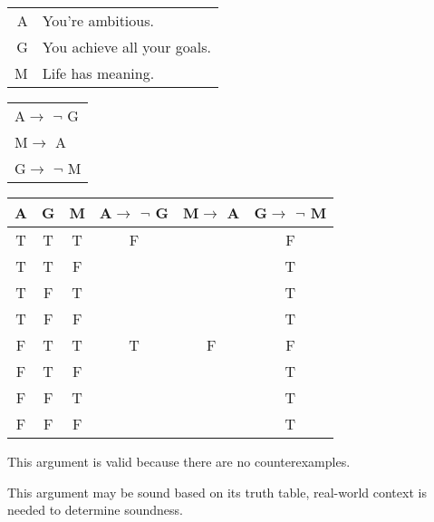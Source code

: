 \section{}
\centering
\begin{tabular}{r l}
    A & You're ambitious. \\
    G & You achieve all your goals. \\
    M & Life has meaning.
\end{tabular}
\begin{tabular}{l}
    A$\rightarrow$ $\lnot$ G\\
    M$\rightarrow$ A\\
    \hline
    G$\rightarrow$ $\lnot$ M
\end{tabular}

\begin{tabular}{c|c|c||c|c||c}
    A & G & M & A$\rightarrow$ $\lnot$ G & M$\rightarrow$ A & G$\rightarrow$ $\lnot$ M \\
    \hline
    T & T & T & F &   & F \\
    T & T & F &   &   & T \\
    T & F & T &   &   & T \\
    T & F & F &   &   & T \\
    F & T & T & T & F & F \\
    F & T & F &   &   & T \\
    F & F & T &   &   & T \\
    F & F & F &   &   & T
\end{tabular}

\justifying
\noindent This argument is valid because there are no counterexamples.

\noindent This argument may be sound based on its truth table, real-world context is needed to determine soundness.